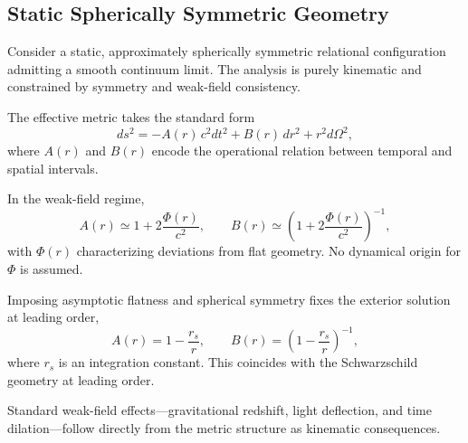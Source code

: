 \subsection{Static Spherically Symmetric Geometry}
  \label{subsec:schwarzschild-recovery}

  Consider a static, approximately spherically symmetric relational
  configuration admitting a smooth continuum limit.
  The analysis is purely kinematic and constrained by symmetry and
  weak-field consistency.

  The effective metric takes the standard form
  \begin{equation}
    ds^2 = -A(r)\,c^2 dt^2 + B(r)\,dr^2 + r^2 d\Omega^2 ,
  \end{equation}
  where $A(r)$ and $B(r)$ encode the operational relation between
  temporal and spatial intervals.

  In the weak-field regime,
  \begin{equation}
    A(r) \simeq 1 + 2\frac{\Phi(r)}{c^2},
    \qquad
    B(r) \simeq \left(1 + 2\frac{\Phi(r)}{c^2}\right)^{-1},
  \end{equation}
  with $\Phi(r)$ characterizing deviations from flat geometry.
  No dynamical origin for $\Phi$ is assumed.

  Imposing asymptotic flatness and spherical symmetry
  fixes the exterior solution at leading order,
  \begin{equation}
    A(r) = 1 - \frac{r_s}{r},
    \qquad
    B(r) = \left(1 - \frac{r_s}{r}\right)^{-1},
  \end{equation}
  where $r_s$ is an integration constant.
  This coincides with the Schwarzschild geometry at leading order.

  Standard weak-field effects—gravitational redshift,
  light deflection, and time dilation—follow directly
  from the metric structure as kinematic consequences.
